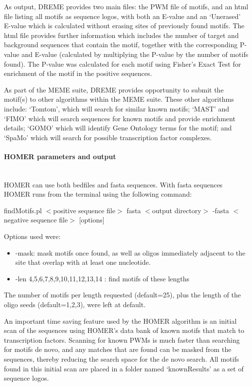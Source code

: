 \documentclass[12pt]{article}
\begin{document}
As output, DREME provides two main files: the PWM file of motifs, and an html file listing all motifs as sequence logos, with both an E-value and an `Unerased' E-value which is calculated without erasing sites of previously found motifs. The html file provides further information which includes the number of target and background sequences that contain the motif, together with the corresponding P-value and E-value (calculated by multiplying the P-value by the number of motifs found). The P-value was calculated for each motif using Fisher's Exact Test for enrichment of the motif in the positive sequences.

As part of the MEME suite, DREME provides opportunity to submit the motif(s) to other algorithms within the MEME suite. These other algorithms include: `Tomtom', which will search for similar known motifs; `MAST' and `FIMO' which will search sequences for known motifs and provide enrichment details; `GOMO' which will identify Gene Ontology terms for the motif; and `SpaMo' which will search for possible transcription factor complexes.


\paragraph{HOMER parameters and output}\mbox{}\\
HOMER can use both bedfiles and fasta sequences. With fasta sequences HOMER runs from the terminal using the following command:
\begin{center}
findMotifs.pl $<$positive sequence file$>$ fasta $<$output directory$>$ -fasta $<$negative sequence file$>$ [options]
\end{center}
Options used were:
\begin{itemize}
\item -mask: mask motifs once found, as well as oligos immediately adjacent to the site that overlap with at least one nucleotide.
\item -len 4,5,6,7,8,9,10,11,12,13,14 : find motifs of these lengths
\end{itemize}
The number of motifs per length requested (default=25), plus the length of the oligo seeds (default=1,2,3), were left at default.

An important time saving feature used by the HOMER algorithm is an initial scan of the sequences using HOMER's data bank of known motifs that match to transcription factors. Scanning for known PWMs is much faster than searching for motifs de novo, and any matches that are found can be masked from the sequences, thereby reducing the search space for the de novo search. All motifs found in this initial scan are placed in a folder named `knownResults' as a set of sequence logos.
\end{document}
